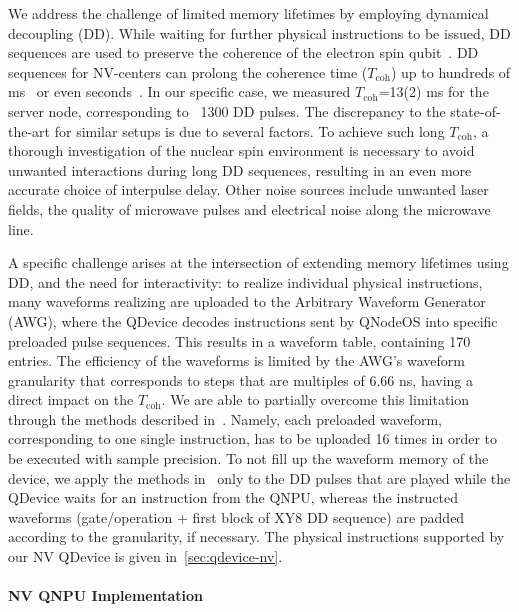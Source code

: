 We address the challenge of limited memory lifetimes by employing dynamical decoupling (DD).  While waiting for further physical instructions to be issued, DD sequences are used to preserve the coherence of the electron spin qubit~\cite{de_lange_universal_2010}. DD sequences for NV-centers can prolong the coherence time ($T_{\text{coh}}$) up to hundreds of ms~\cite{hermans2022qubit} or even seconds~\cite{abobeih_2018_one_sec}. In our specific case, we measured $T_{\text{coh}}$=13(2) ms for the server node, corresponding to ~1300 DD pulses. The discrepancy to the state-of-the-art for similar setups is due to several factors. To achieve such long $T_{\text{coh}}$, a thorough investigation of the nuclear spin environment is necessary to avoid unwanted interactions during long DD sequences, resulting in an even more accurate choice of interpulse delay. Other noise sources include unwanted laser fields, the quality of microwave pulses and electrical noise along the microwave line.  

A specific challenge arises at the intersection of extending memory lifetimes using DD, and the need for interactivity: to realize individual physical instructions, many waveforms realizing are uploaded to the Arbitrary Waveform Generator (AWG), where the QDevice decodes instructions sent by QNodeOS into specific preloaded pulse sequences. This results in a waveform table, containing 170 entries. The efficiency of the waveforms is limited by the AWG's waveform granularity that corresponds to steps that are multiples of 6.66 ns, having a direct impact on the $T_{\text{coh}}$. We are able to partially overcome this limitation through the methods described in~\cite{corna_efficient_2021}. Namely, each preloaded waveform, corresponding to one single instruction, has to be uploaded 16 times in order to be executed with sample precision. To not fill up the waveform memory of the device, we apply the methods in~\cite{corna_efficient_2021} only to the DD pulses that are played while the QDevice waits for an instruction from the QNPU, whereas the instructed waveforms (gate/operation + first block of XY8 DD sequence) are padded according to the granularity, if necessary.
The physical instructions supported by our NV QDevice is given in~\cref{sec:qdevice-nv}.

\paragraph{NV QNPU Implementation}

